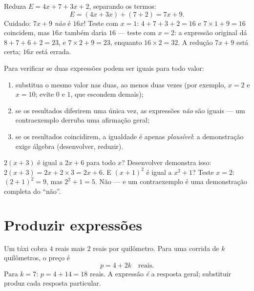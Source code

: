 \begin{example}\label{ex:g7:literal:reduce}
Reduza $E = 4x + 7 + 3x + 2$, separando os termos:
\[
E = (4x + 3x) + (7 + 2) = 7x + 9 .
\]
Cuidado: $7x + 9$ \emph{não} é $16x$! Teste com $x = 1$:
$4 + 7 + 3 + 2 = 16$ e $7 \times 1 + 9 = 16$ coincidem, mas $16x$
também daria $16$ --- teste com $x = 2$: a expressão original dá
$8 + 7 + 6 + 2 = 23$, e $7 \times 2 + 9 = 23$, enquanto
$16 \times 2 = 32$. A redução $7x + 9$ está certa; $16x$ está errada.
\end{example}

\begin{method}\label{met:g7:literal:test}
Para verificar se duas expressões podem ser iguais para todo valor:
\begin{enumerate}
  \item substitua o mesmo valor nas duas, ao menos duas vezes (por
        exemplo, $x = 2$ e $x = 10$; evite $0$ e $1$, que escondem
         demais);
  \item se os resultados diferirem uma única vez, as expressões
        \emph{não} são iguais --- um contraexemplo derruba uma
        afirmação geral;
  \item se os resultados coincidirem, a igualdade é apenas
        \emph{plausível}: a demonstração exige álgebra (desenvolver,
        reduzir).
\end{enumerate}
\end{method}

\begin{example}\label{ex:g7:literal:test}
$2(x + 3)$ é igual a $2x + 6$ para todo $x$? Desenvolver demonstra
isso: $2(x+3) = 2x + 2 \times 3 = 2x + 6$. E $(x + 1)^2$ é igual a
$x^2 + 1$? Teste $x = 2$: $(2+1)^2 = 9$, mas $2^2 + 1 = 5$. Não --- e
um contraexemplo é uma demonstração completa do ``não''.
\end{example}

\section{Produzir expressões}

\begin{example}\label{ex:g7:literal:produce}
Um táxi cobra $4$ reais mais $2$ reais por quilômetro. Para uma corrida
de $k$ quilômetros, o preço é
\[
p = 4 + 2k \quad\text{reais}.
\]
Para $k = 7$: $p = 4 + 14 = 18$ reais. A expressão \emph{é} a resposta
geral; substituir produz cada resposta particular.
\end{example}

